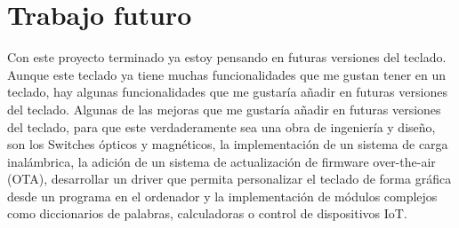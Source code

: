 \section{Trabajo futuro}
Con este proyecto terminado ya estoy pensando en futuras versiones del teclado. Aunque este teclado ya tiene muchas funcionalidades que me gustan tener en un teclado, hay algunas funcionalidades que me gustaría añadir en futuras versiones del teclado. Algunas de las mejoras que me gustaría añadir en futuras versiones del teclado, para que este verdaderamente sea una obra de ingeniería y diseño, son los \gls{Switches} ópticos y magnéticos, la implementación de un sistema de carga inalámbrica, la adición de un sistema de actualización de firmware over-the-air (OTA), desarrollar un driver que permita personalizar el teclado de forma gráfica desde un programa en el ordenador y la implementación de módulos complejos como diccionarios de palabras, calculadoras o control de dispositivos IoT.